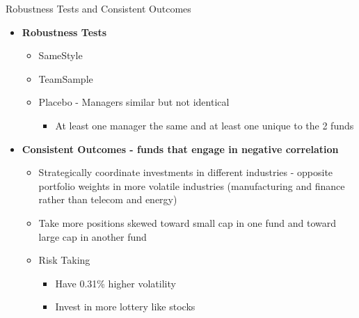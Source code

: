 \documentclass[12pt, aspectratio = 169%
]{beamer}
\newcommand{\1}{{\mathbbm{1}}}
\begin{document}
\begin{frame}{Robustness Tests and Consistent Outcomes}
\begin{itemize}
	\item \textbf{Robustness Tests}
	\begin{itemize}
		\item \small SameStyle
		\item \small TeamSample
		\item \small Placebo - Managers similar but not identical
			\begin{itemize}
				\item At least one manager the same and at least one unique to the 2 funds
			\end{itemize}
	\end{itemize}
	\item \textbf{Consistent Outcomes - funds that engage in negative correlation}
		\begin{itemize}
		\item \small Strategically coordinate investments in different industries - opposite portfolio weights 				in more volatile industries (manufacturing and finance rather than telecom and energy)
		\item \small Take more positions skewed toward small cap in one fund and toward 							large cap in another fund
		\item \small Risk Taking
			\begin{itemize}
				\item Have 0.31\% higher 	volatility			
				\item Invest in more lottery like stocks 
			\end{itemize}
	\end{itemize}
\end{itemize}
\end{frame}
\end{document}
